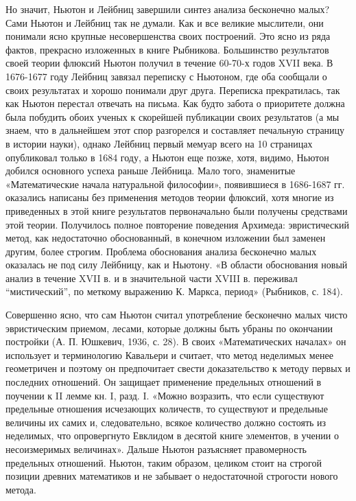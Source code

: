 Но значит, Ньютон и Лейбниц завершили синтез анализа бесконечно
малых? Сами Ньютон и Лейбниц так не думали. Как и все великие
мыслители, они понимали ясно крупные несовершенства своих построений.
Это ясно из ряда фактов, прекрасно изложенных в книге Рыбникова.
Большинство результатов своей теории флюксий Ньютон получил в течение
60-70-х годов XVII века. В 1676-1677 году Лейбниц завязал переписку с
Ньютоном, где оба сообщали о своих результатах и хорошо понимали друг
друга. Переписка прекратилась, так как Ньютон перестал отвечать на
письма. Как будто забота о приоритете должна была побудить обоих
ученых к скорейшей публикации своих результатов (а мы знаем, что в
дальнейшем этот спор разгорелся и составляет печальную страницу в
истории науки), однако Лейбниц первый мемуар всего на 10 страницах
опубликовал только в 1684 году, а Ньютон еще позже, хотя, видимо,
Ньютон добился основного успеха раньше Лейбница. Мало того, знаменитые
«Математические начала натуральной философии», появившиеся в 1686-1687
гг. оказались написаны без применения методов теории флюксий, хотя
многие из приведенных в этой книге результатов первоначально были
получены средствами этой теории. Получилось полное повторение
поведения Архимеда: эвристический метод, как недостаточно
обоснованный, в конечном изложении был заменен другим, более строгим.
Проблема обоснования анализа бесконечно малых оказалась не под силу
Лейбницу, как и Ньютону. «В области обоснования новый анализ в течение
XVII в. и в значительной части XVIII в. переживал ``мистический'', по
меткому выражению К. Маркса, период» (Рыбников, с. 184).

Совершенно ясно, что сам Ньютон считал употребление бесконечно малых
чисто эвристическим приемом, лесами, которые должны быть убраны по
окончании постройки (А. П. Юшкевич, 1936, с. 28). В своих
«Математических началах» он использует и терминологию Кавальери и
считает, что метод неделимых менее геометричен и поэтому он
предпочитает свести доказательство к методу первых и последних
отношений. Он защищает применение предельных отношений в поучении к II
лемме кн. I, разд. I. «Можно возразить, что если существуют предельные
отношения исчезающих количеств, то существуют и предельные величины их
самих и, следовательно, всякое количество должно состоять из
неделимых, что опровергнуто Евклидом в десятой книге элементов, в
учении о несоизмеримых величинах». Дальше Ньютон разъясняет
правомерность предельных отношений. Ньютон, таким образом, целиком
стоит на строгой позиции древних математиков и не забывает о
недостаточной строгости нового метода.

